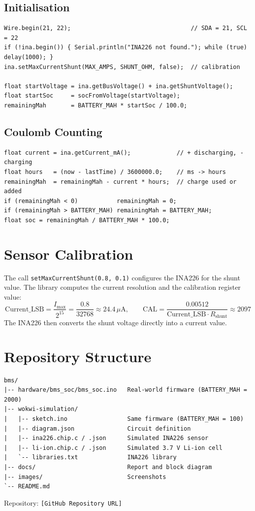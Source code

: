 \documentclass[12pt,a4paper,oneside]{report}
\newcommand{\githuburl}{[GitHub Repository URL]}
\begin{document}
\subsection{Initialisation}
\begin{lstlisting}
Wire.begin(21, 22);                                  // SDA = 21, SCL = 22
if (!ina.begin()) { Serial.println("INA226 not found."); while (true) delay(1000); }
ina.setMaxCurrentShunt(MAX_AMPS, SHUNT_OHM, false);  // calibration

float startVoltage = ina.getBusVoltage() + ina.getShuntVoltage();
float startSoc     = socFromVoltage(startVoltage);
remainingMah       = BATTERY_MAH * startSoc / 100.0;
\end{lstlisting}

\subsection{Coulomb Counting}
\begin{lstlisting}
float current = ina.getCurrent_mA();             // + discharging, - charging
float hours   = (now - lastTime) / 3600000.0;    // ms -> hours
remainingMah  = remainingMah - current * hours;  // charge used or added
if (remainingMah < 0)           remainingMah = 0;
if (remainingMah > BATTERY_MAH) remainingMah = BATTERY_MAH;
float soc = remainingMah / BATTERY_MAH * 100.0;
\end{lstlisting}

\section{Sensor Calibration}
The call \texttt{setMaxCurrentShunt(0.8, 0.1)} configures the INA226 for the shunt value. The library computes the current resolution and the calibration register value:
\begin{equation}
  \text{Current\_LSB} = \frac{I_{\max}}{2^{15}} = \frac{0.8}{32768} \approx 24.4\,\mu\text{A}, \qquad
  \text{CAL} = \frac{0.00512}{\text{Current\_LSB} \cdot R_{\text{shunt}}} \approx 2097
\end{equation}
The INA226 then converts the shunt voltage directly into a current value.

\section{Repository Structure}
\begin{lstlisting}[language={}, numbers=none, basicstyle=\ttfamily\scriptsize]
bms/
|-- hardware/bms_soc/bms_soc.ino   Real-world firmware (BATTERY_MAH = 2000)
|-- wokwi-simulation/
|   |-- sketch.ino                 Same firmware (BATTERY_MAH = 100)
|   |-- diagram.json               Circuit definition
|   |-- ina226.chip.c / .json      Simulated INA226 sensor
|   |-- li-ion.chip.c / .json      Simulated 3.7 V Li-ion cell
|   `-- libraries.txt              INA226 library
|-- docs/                          Report and block diagram
|-- images/                        Screenshots
`-- README.md
\end{lstlisting}
Repository: \texttt{\githuburl}
\end{document}
